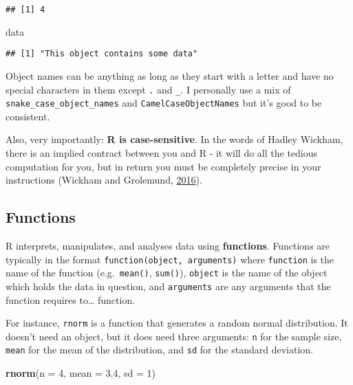 \documentclass[]{tufte-handout}
\newenvironment{Shaded}{}{}
\newcommand{\DataTypeTok}[1]{\textcolor[rgb]{0.56,0.13,0.00}{#1}}
\newcommand{\DecValTok}[1]{\textcolor[rgb]{0.25,0.63,0.44}{#1}}
\newcommand{\FloatTok}[1]{\textcolor[rgb]{0.25,0.63,0.44}{#1}}
\newcommand{\KeywordTok}[1]{\textcolor[rgb]{0.00,0.44,0.13}{\textbf{#1}}}
\newcommand{\NormalTok}[1]{#1}
\begin{document}
\begin{verbatim}
## [1] 4
\end{verbatim}

\begin{Shaded}
\begin{Highlighting}[]
\NormalTok{data}
\end{Highlighting}
\end{Shaded}

\begin{verbatim}
## [1] "This object contains some data"
\end{verbatim}

Object names can be anything as long as they start with a letter and
have no special characters in them except \texttt{.} and \texttt{\_}. I
personally use a mix of \texttt{snake\_case\_object\_names} and
\texttt{CamelCaseObjectNames} but it's good to be consistent.

Also, very importantly: \textbf{R is case-sensitive}. In the words of
Hadley Wickham, there is an implied contract between you and R - it will
do all the tedious computation for you, but in return you must be
completely precise in your instructions (Wickham and Grolemund,
\protect\hyperlink{ref-WickhamR4DS}{2016}).

\hypertarget{functions}{%
\subsection{Functions}\label{functions}}

R interprets, manipulates, and analyses data using \textbf{functions}.
Functions are typically in the format
\texttt{function(object,\ arguments)} where \texttt{function} is the
name of the function (e.g.~\texttt{mean()}, \texttt{sum()}),
\texttt{object} is the name of the object which holds the data in
question, and \texttt{arguments} are any arguments that the function
requires to\ldots{} function.

For instance, \texttt{rnorm} is a function that generates a random
normal distribution. It doesn't need an object, but it does need three
arguments: \texttt{n} for the sample size, \texttt{mean} for the mean of
the distribution, and \texttt{sd} for the standard deviation.

\begin{Shaded}
\begin{Highlighting}[]
\KeywordTok{rnorm}\NormalTok{(}\DataTypeTok{n =} \DecValTok{4}\NormalTok{, }\DataTypeTok{mean =} \FloatTok{3.4}\NormalTok{, }\DataTypeTok{sd =} \DecValTok{1}\NormalTok{)}
\end{Highlighting}
\end{Shaded}
\end{document}

